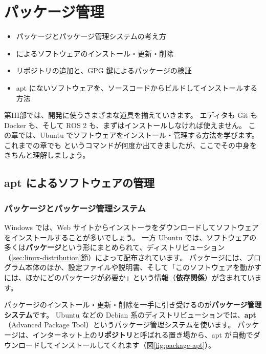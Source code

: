 \chapter{パッケージ管理}
\label{chap:package}

\begin{goalbox}
  \begin{itemize}
    \item パッケージとパッケージ管理システムの考え方
    \item {} によるソフトウェアのインストール・更新・削除
    \item リポジトリの追加と、GPG 鍵によるパッケージの検証
    \item apt にないソフトウェアを、ソースコードからビルドしてインストールする方法
  \end{itemize}
\end{goalbox}

第III部では、開発に使うさまざまな道具を揃えていきます。
エディタも Git も Docker も、そして ROS 2 も、まずはインストールしなければ使えません。
この章では、Ubuntu でソフトウェアをインストール・管理する方法を学びます。
これまでの章でも  というコマンドが何度か出てきましたが、ここでその中身をきちんと理解しましょう。

\section{apt によるソフトウェアの管理}
\label{sec:package-apt}

\subsection{パッケージとパッケージ管理システム}

Windows では、Web サイトからインストーラをダウンロードしてソフトウェアをインストールすることが多いでしょう。
一方 Ubuntu では、ソフトウェアの多くは\textbf{パッケージ}という形にまとめられて、ディストリビューション（\ref{sec:linux-distribution}節）によって配布されています。
パッケージには、プログラム本体のほか、設定ファイルや説明書、そして「このソフトウェアを動かすには、ほかにどのパッケージが必要か」という情報（\textbf{依存関係}）が含まれています。

パッケージのインストール・更新・削除を一手に引き受けるのが\textbf{パッケージ管理システム}です。
Ubuntu などの Debian 系のディストリビューションでは、\textbf{apt}（Advanced Package Tool）というパッケージ管理システムを使います。
パッケージは、インターネット上の\textbf{リポジトリ}と呼ばれる置き場から、apt が自動でダウンロードしてインストールしてくれます（図\ref{fig:package-apt}）。

